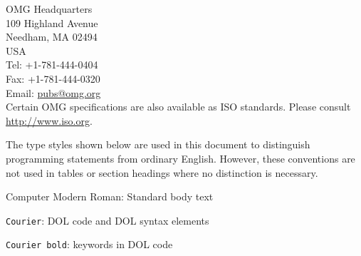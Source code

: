 \documentclass[10pt, a4paper]{isov2}
\begin{document}
\medskip
\noindent 
OMG Headquarters \\
109 Highland Avenue \\
Needham, MA 02494 \\
USA\\
Tel: +1-781-444-0404\\
Fax: +1-781-444-0320\\
Email: \url{pubs@omg.org}\\

\noindent Certain OMG specifications are also available as ISO standards. Please consult \url{http://www.iso.org}.




The type styles shown below are used in this document to distinguish
 programming statements from ordinary English. However, these conventions are
 not used in tables or section headings where no distinction is necessary.


\medskip \noindent
Computer Modern Roman: Standard body text

\lstinline{Courier}: DOL code and DOL syntax elements

\lstinline[keywordstyle=\color{black}\bfseries, keywords={Courier, bold}]{Courier bold}: keywords in DOL code



%
%
%
%

 
\end{document}
